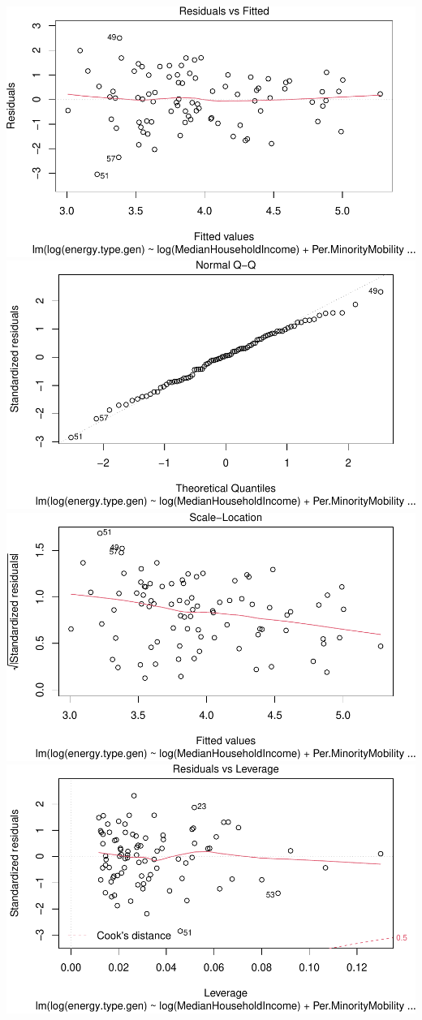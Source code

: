 \documentclass[
  12pt,
]{article}
\begin{document}
\includegraphics{Project_files/figure-latex/unnamed-chunk-6-1.pdf}
\includegraphics{Project_files/figure-latex/unnamed-chunk-6-2.pdf}
\includegraphics{Project_files/figure-latex/unnamed-chunk-6-3.pdf}
\includegraphics{Project_files/figure-latex/unnamed-chunk-6-4.pdf}
\end{document}
